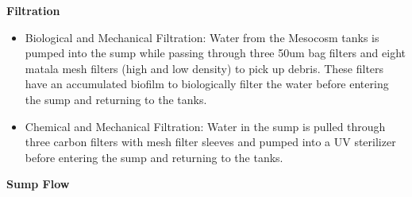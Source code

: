 \documentclass[]{book}
\providecommand{\tightlist}{%
  \setlength{\itemsep}{0pt}\setlength{\parskip}{0pt}}
\begin{document}
 \textbf{Filtration}

\begin{itemize}
\tightlist
\item
  Biological and Mechanical Filtration: Water from the Mesocosm tanks is
  pumped into the sump while passing through three 50um bag filters and
  eight matala mesh filters (high and low density) to pick up debris.
  These filters have an accumulated biofilm to biologically filter the
  water before entering the sump and returning to the tanks.
\item
  Chemical and Mechanical Filtration: Water in the sump is pulled
  through three carbon filters with mesh filter sleeves and pumped into
  a UV sterilizer before entering the sump and returning to the tanks.
\end{itemize}

 \textbf{Sump Flow}
\end{document}

